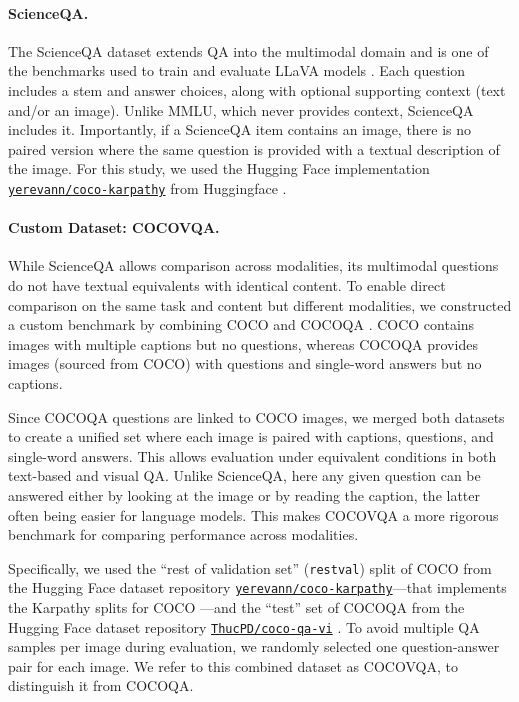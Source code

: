\paragraph{ScienceQA.}

The ScienceQA dataset \cite{luLearnExplainMultimodal2022} extends QA into the multimodal domain and is one of the benchmarks used to train and evaluate LLaVA models \cite{liuVisualInstructionTuning2023, liuImprovedBaselinesVisual2024, liLLaVANeXTInterleaveTacklingMultiimage2024, zhangLLaVAMiniEfficientImage2025}. Each question includes a stem and answer choices, along with optional supporting context (text and/or an image). Unlike MMLU, which never provides context, ScienceQA includes it. Importantly, if a ScienceQA item contains an image, there is no paired version where the same question is provided with a textual description of the image. For this study, we used the Hugging Face implementation \href{https://huggingface.co/datasets/yerevann/coco-karpathy}{\texttt{yerevann/coco-karpathy}} from Huggingface \cite{coco_karpathy_dataset}.

\paragraph{Custom Dataset: COCOVQA.}

While ScienceQA allows comparison across modalities, its multimodal questions do not have textual equivalents with identical content. To enable direct comparison on the same task and content but different modalities, we constructed a custom benchmark by combining COCO \cite{linMicrosoftCOCOCommon2015} and COCOQA \cite{renExploringModelsData2015}. COCO contains images with multiple captions but no questions, whereas COCOQA provides images (sourced from COCO) with questions and single-word answers but no captions.

Since COCOQA questions are linked to COCO images, we merged both datasets to create a unified set where each image is paired with captions, questions, and single-word answers. This allows evaluation under equivalent conditions in both text-based and visual QA. Unlike ScienceQA, here any given question can be answered either by looking at the image or by reading the caption, the latter often being easier for language models. This makes COCOVQA a more rigorous benchmark for comparing performance across modalities.

Specifically, we used the ``rest of validation set'' (\texttt{restval}) split of COCO from the Hugging Face dataset repository \href{https://huggingface.co/datasets/yerevann/coco-karpathy}{\texttt{yerevann/coco-karpathy}}---that implements the Karpathy splits for COCO \cite{karpathyDeepVisualSemanticAlignments2015}---and the ``test'' set of COCOQA from the Hugging Face dataset repository \href{https://huggingface.co/datasets/ThucPDCocoqaviDatasets}{\texttt{ThucPD/coco-qa-vi}} \cite{coco_qa_vi_dataset}. To avoid multiple QA samples per image during evaluation, we randomly selected one question-answer pair for each image. We refer to this combined dataset as COCOVQA, to distinguish it from COCOQA.

